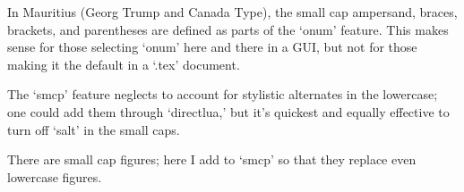 \documentclass{article}
\begin{document}
In Mauritius (Georg Trump and Canada Type), the small cap ampersand,
braces, brackets, and parentheses are defined as parts of the ‘onum’
feature. This makes sense for those selecting ‘onum’ here and there in
a GUI, but not for those making it the default in a ‘.tex’ document.

The ‘smcp’ feature neglects to account for stylistic alternates in the
lowercase; one could add them through ‘directlua,’ but it’s quickest
and equally effective to turn off ‘salt’ in the small caps.

There are small cap figures; here I add to ‘smcp’ so that they replace
even lowercase figures.
\end{document}
